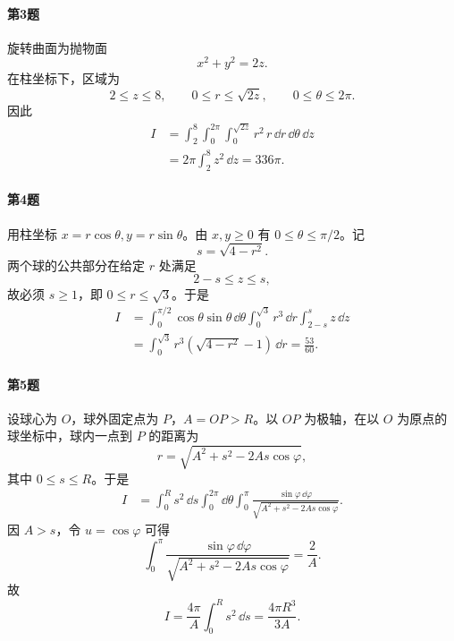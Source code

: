 \paragraph{第3题}
\begin{xsolution}
旋转曲面为抛物面
\[
 x^2+y^2=2z.
\]
在柱坐标下，区域为
\[
 2\le z\le8,
 \qquad0\le r\le\sqrt{2z},
 \qquad0\le\theta\le2\pi.
\]
因此
\begin{align*}
 I&=\int_2^8\int_0^{2\pi}\int_0^{\sqrt{2z}}r^2\,r\,\dd r\,\dd\theta\,\dd z\\
 &=2\pi\int_2^8 z^2\,\dd z
 =\boxed{336\pi}.
\end{align*}
\end{xsolution}

\paragraph{第4题}
\begin{xsolution}
用柱坐标 $x=r\cos\theta,y=r\sin\theta$。由 $x,y\ge0$ 有 $0\le\theta\le\pi/2$。记
\[
 s=\sqrt{4-r^2}.
\]
两个球的公共部分在给定 $r$ 处满足
\[
 2-s\le z\le s,
\]
故必须 $s\ge1$，即 $0\le r\le\sqrt3$。于是
\begin{align*}
 I&=\int_0^{\pi/2}\cos\theta\sin\theta\,\dd\theta
 \int_0^{\sqrt3}r^3\,\dd r\int_{2-s}^{s}z\,\dd z\\
 &=\int_0^{\sqrt3}r^3(\sqrt{4-r^2}-1)\,\dd r
 =\boxed{\frac{53}{60}}.
\end{align*}
\end{xsolution}

\paragraph{第5题}
\begin{xsolution}
设球心为 $O$，球外固定点为 $P$，$A=OP>R$。以 $OP$ 为极轴，在以 $O$ 为原点的球坐标中，球内一点到 $P$ 的距离为
\[
 r=\sqrt{A^2+s^2-2As\cos\varphi},
\]
其中 $0\le s\le R$。于是
\begin{align*}
 I&=\int_0^R s^2\,\dd s\int_0^{2\pi}\dd\theta
 \int_0^\pi\frac{\sin\varphi\,\dd\varphi}
 {\sqrt{A^2+s^2-2As\cos\varphi}}.
\end{align*}
因 $A>s$，令 $u=\cos\varphi$ 可得
\[
 \int_0^\pi\frac{\sin\varphi\,\dd\varphi}
 {\sqrt{A^2+s^2-2As\cos\varphi}}=\frac2A.
\]
故
\[
 I=\frac{4\pi}{A}\int_0^Rs^2\,\dd s
 =\boxed{\frac{4\pi R^3}{3A}}.
\]
\end{xsolution}

